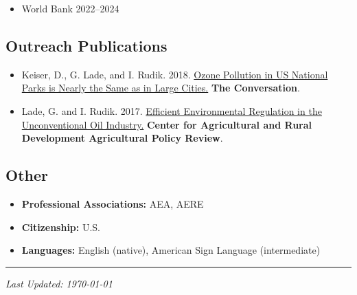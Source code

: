 \documentclass[12pt]{res} %
\begin{document}
\begin{resume}
\begin{itemize} %
	\item[] World Bank \hfill 2022--2024
\end{itemize}

\vspace{-.2in}

\subsection{Outreach Publications}

\begin{itemize} %
	\item[] Keiser, D., G. Lade, and I. Rudik. 2018. \href{https://theconversation.com/ozone-pollution-in-us-national-parks-is-nearly-the-same-as-in-large-cities-100148}{Ozone Pollution in US National Parks is Nearly the Same as in Large Cities.} \textbf{The Conversation}.
	\item[] Lade, G. and I. Rudik. 2017. \href{https://www.card.iastate.edu/ag_policy_review/display.aspx?id=70}{Efficient Environmental Regulation in the Unconventional Oil Industry.} \textbf{Center for Agricultural and Rural Development Agricultural Policy Review}.
\end{itemize}

\vspace{-.2in}

\subsection{Other}

\begin{itemize}
	\item[] \textbf{Professional Associations:} AEA, AERE
	\item[] \textbf{Citizenship:} U.S.
	\item[] \textbf{Languages:} English (native), American Sign Language (intermediate)
\end{itemize}
\hrule

\vspace{0.1in} %



\centerline{\emph{Last Updated: \today}}
\pagebreak



\end{resume}
\end{document}
